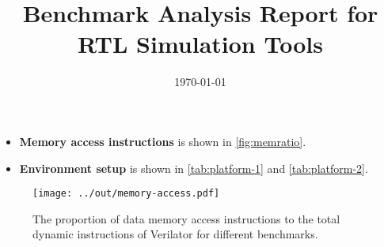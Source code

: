 \documentclass{article}
\title{Benchmark Analysis Report for RTL Simulation Tools}
\date{\today}
\author{}
\begin{document}
\maketitle

\begin{itemize}[noitemsep,topsep=0pt]
    \item {\bf Memory access instructions } is shown in \autoref{fig:memratio}.
    \item {\bf Environment setup} is shown in \autoref{tab:platform-1} and \autoref{tab:platform-2}.
  \end{itemize}



\begin{figure}[h!]
  \centering
  \texttt{[image: ../out/memory-access.pdf]}
  \vspace*{-4mm}
  \caption{The proportion of data memory access instructions to the total dynamic instructions of Verilator for different benchmarks.}
  \label{fig:memratio}
\end{figure}


\centering

\end{document}
